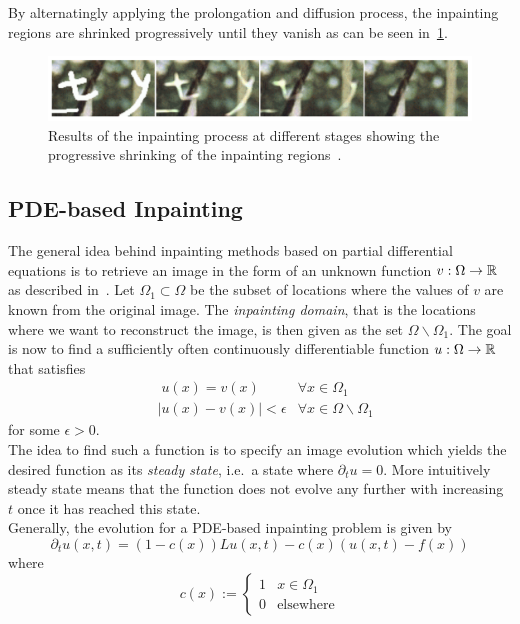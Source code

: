 By alternatingly applying the prolongation and diffusion process, the inpainting regions are
shrinked progressively until they vanish as can be seen in~\ref{fig:InpaintingProgress}.
\begin{figure}[h]
    \centering
    \includegraphics[width=\linewidth]{../Images/inpainting_progress.png}
    \caption{Results of the inpainting process at different stages showing the progressive
    shrinking of the inpainting regions~\cite{bertalmio00}.}\label{fig:InpaintingProgress}
\end{figure}

\subsection{PDE-based Inpainting}
The general idea behind inpainting methods based on partial differential equations  is to
retrieve an image in the form of an unknown function $v: \Omega \rightarrow \mathbb{R}$ as described 
in~\cite{galic05}. Let $\Omega_1\subset\Omega$ be the subset of locations where the values 
of $v$ are known from the original image. The \textit{inpainting domain}, that is the locations 
where we want to reconstruct the image, is then given as the set $\Omega\backslash\Omega_1$. 
The goal is now to find a sufficiently often continuously differentiable function
$u:\Omega\rightarrow\mathbb{R}$ that satisfies
\begin{align}
    &\; u(x) = v(x) &\forall x\in\Omega_1\\
    &\vert u(x) - v(x) \vert < \epsilon &\forall x\in\Omega\backslash\Omega_1
\end{align}
for some $\epsilon>0$.\\
The idea to find such a function is to specify an image evolution which yields the desired
function as its \textit{steady state}, i.e.\ a state where $\partial_{t}u = 0$. More intuitively 
steady state means that the function does not evolve any further with increasing $t$ once it has
reached this state.\\
Generally, the evolution for a PDE-based inpainting problem is given by
\begin{equation}
    \partial_t u(x,t) = (1-c(x))Lu(x,t) - c(x) (u(x, t) - f(x))\label{eq:Evolution}
\end{equation}
where 
\begin{equation} 
    c(x) := \begin{cases}
        1&x\in\Omega_1\\
        0&\text{elsewhere}
    \end{cases} 
\end{equation}
